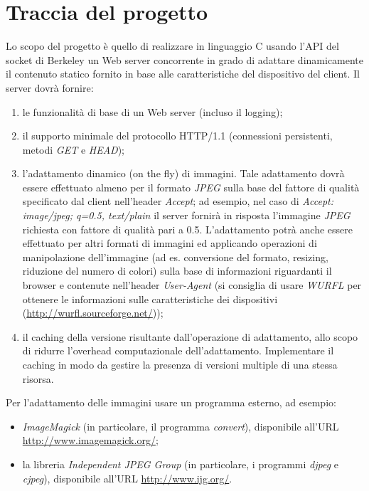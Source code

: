 \documentclass[a4paper, titlepage]{article}
\begin{document}
	\section{Traccia del progetto}
	\begin{flushleft}
		Lo scopo del progetto è quello di realizzare in linguaggio C usando l'API del socket di Berkeley un Web	server concorrente in grado di adattare dinamicamente il contenuto statico fornito in base alle caratteristiche del dispositivo del client. Il server dovrà fornire:
		\begin{enumerate}
			\item le funzionalità di base di un Web server (incluso il logging);
			\item il supporto minimale del protocollo HTTP/1.1 (connessioni persistenti, metodi \textit{GET} e \textit{HEAD});
			\item l'adattamento dinamico (on the fly) di immagini. Tale adattamento dovrà essere effettuato almeno per il formato \textit{JPEG} sulla base del fattore di qualità specificato dal client nell’header	\textit{Accept}; ad esempio, nel caso di \textit{Accept: image/jpeg; q=0.5, text/plain} il server fornirà in risposta l’immagine \textit{JPEG} richiesta con fattore di qualità pari a 0.5. L’adattamento potrà anche essere effettuato per altri formati di immagini ed applicando operazioni di manipolazione dell’immagine (ad es. conversione del formato, resizing, riduzione del numero di colori) sulla base di informazioni riguardanti il browser e contenute nell’header \textit{User-Agent} (si consiglia di usare \textit{WURFL} per ottenere le informazioni sulle caratteristiche dei dispositivi (\url{http://wurfl.sourceforge.net/}));
			\item il caching della versione risultante dall’operazione di adattamento, allo scopo di ridurre l’overhead computazionale dell’adattamento. Implementare il caching in modo da gestire la presenza di versioni multiple di una stessa risorsa.
		\end{enumerate}
		Per l’adattamento delle immagini usare un programma esterno, ad esempio:
		\begin{itemize}
			\item \textit{ImageMagick} (in particolare, il programma \textit{convert}), disponibile all’URL \url{http://www.imagemagick.org/};
			\item la libreria \textit{Independent JPEG Group} (in particolare, i programmi \textit{djpeg} e \textit{cjpeg}), disponibile all’URL \url{http://www.ijg.org/}.
		\end{itemize}

\end{flushleft}
\end{document}
